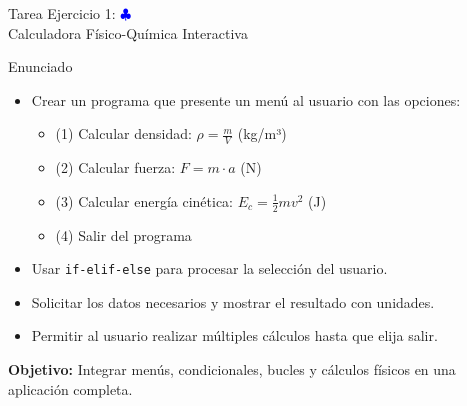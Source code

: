 \documentclass[10pt]{beamer}
\begin{document}
\begin{frame}{Tarea Ejercicio 1: \hfill \textcolor{blue}{$\clubsuit$} \\ Calculadora Físico-Química Interactiva}
  \begin{block}{Enunciado}
    \begin{itemize}
      \item Crear un programa que presente un menú al usuario con las opciones:
        \begin{itemize}
          \item (1) Calcular densidad: \(\rho = \frac{m}{V}\) (kg/m³)
          \item (2) Calcular fuerza: \(F = m \cdot a\) (N)
          \item (3) Calcular energía cinética: \(E_c = \frac{1}{2}mv^2\) (J)
          \item (4) Salir del programa
        \end{itemize}
      \item Usar \texttt{if-elif-else} para procesar la selección del usuario.
      \item Solicitar los datos necesarios y mostrar el resultado con unidades.
      \item Permitir al usuario realizar múltiples cálculos hasta que elija salir.
    \end{itemize}
  \end{block}
  
  \textbf{Objetivo:} Integrar menús, condicionales, bucles y cálculos físicos en una aplicación completa.
\end{frame}
\end{document}
